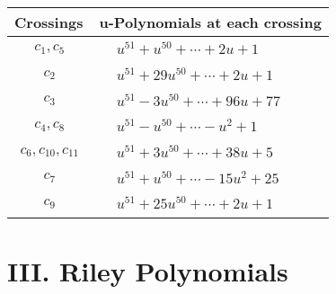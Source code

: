 \documentclass[1p]{elsarticle_modified}
\theoremstyle{definition}
\begin{document}
\begin{tabular}{m{50pt}|m{274pt}}
Crossings & \hspace{64pt}u-Polynomials at each crossing \\
\hline $$\begin{aligned}c_{1},c_{5}\end{aligned}$$&$\begin{aligned}
&u^{51}+u^{50}+\cdots+2 u+1
\end{aligned}$\\
\hline $$\begin{aligned}c_{2}\end{aligned}$$&$\begin{aligned}
&u^{51}+29 u^{50}+\cdots+2 u+1
\end{aligned}$\\
\hline $$\begin{aligned}c_{3}\end{aligned}$$&$\begin{aligned}
&u^{51}-3 u^{50}+\cdots+96 u+77
\end{aligned}$\\
\hline $$\begin{aligned}c_{4},c_{8}\end{aligned}$$&$\begin{aligned}
&u^{51}- u^{50}+\cdots- u^2+1
\end{aligned}$\\
\hline $$\begin{aligned}c_{6},c_{10},c_{11}\end{aligned}$$&$\begin{aligned}
&u^{51}+3 u^{50}+\cdots+38 u+5
\end{aligned}$\\
\hline $$\begin{aligned}c_{7}\end{aligned}$$&$\begin{aligned}
&u^{51}+u^{50}+\cdots-15 u^2+25
\end{aligned}$\\
\hline $$\begin{aligned}c_{9}\end{aligned}$$&$\begin{aligned}
&u^{51}+25 u^{50}+\cdots+2 u+1
\end{aligned}$\\
\hline
\end{tabular}\newpage\renewcommand{\arraystretch}{1}
\centering \section*{ III. Riley Polynomials}
\end{document}
